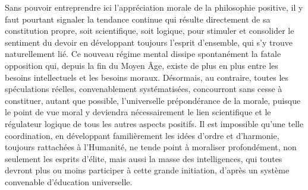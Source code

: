 \documentclass[french,twoside]{book} %
\begin{document}
Sans pouvoir entreprendre ici l’appréciation morale de la philosophie positive, il y faut pourtant signaler la tendance continue qui résulte directement de sa constitution propre, soit scientifique, soit logique, pour stimuler et consolider le sentiment du devoir en développant toujours l’esprit d’ensemble, qui s’y trouve naturellement lié. Ce nouveau régime mental dissipe spontanément la fatale opposition qui, depuis la fin du Moyen Âge, existe de plus en plus entre les besoins intellectuels et les besoins moraux. Désormais, au contraire, toutes les spéculations réelles, convenablement systématisées, concourront sans cesse à constituer, autant que possible, l’universelle prépondérance de la morale, puisque le point de vue moral y deviendra nécessairement le lien scientifique et le régulateur logique de tous les autres aspects positifs. Il est impossible qu’une telle coordination, en développant familièrement les idées d’ordre et d’harmonie, toujours rattachées à l’Humanité, ne tende point à moraliser profondément, non seulement les esprits d’élite, mais aussi la masse des intelligences, qui toutes devront plus ou moins participer à cette grande initiation, d’après un système convenable d’éducation universelle.\par
\end{document}
